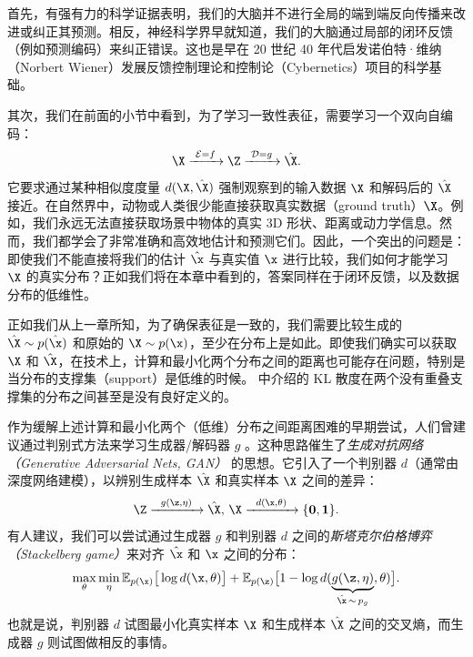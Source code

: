 \documentclass[../../book-main_zh.tex]{subfiles}
\begin{document}
首先，有强有力的科学证据表明，我们的大脑并不进行全局的端到端反向传播来改进或纠正其预测。相反，神经科学界早就知道，我们的大脑通过局部的闭环反馈（例如预测编码）来纠正错误。这也是早在 20 世纪 40 年代启发诺伯特·维纳（Norbert Wiener）发展反馈控制理论和控制论（Cybernetics）项目的科学基础。

其次，我们在前面的小节中看到，为了学习一致性表征，需要学习一个双向自编码：
\begin{equation}
    \X
    \xrightarrow{\hspace{1mm} \mathcal{E} = f \hspace{1mm}} \Z
    \xrightarrow{\hspace{1mm} \mathcal{D} = g \hspace{1mm}} \hat{\X}.
\end{equation}
它要求通过某种相似度度量 $d(\X, \hat \X)$ 强制观察到的输入数据 $\X$ 和解码后的 $\hat \X$ 接近。在自然界中，动物或人类很少能直接获取真实数据（ground truth）$\X$。例如，我们永远无法直接获取场景中物体的真实 3D 形状、距离或动力学信息。然而，我们都学会了非常准确和高效地估计和预测它们。因此，一个突出的问题是：即使我们不能直接将我们的估计 $\hat \x$ 与真实值 $\x$ 进行比较，我们如何才能学习 $\X$ 的真实分布？正如我们将在本章中看到的，答案同样在于闭环反馈，以及数据分布的低维性。

正如我们从上一章所知，为了确保表征是一致的，我们需要比较生成的 $\hat \X \sim p(\hat\x)$ 和原始的 $\X \sim p(\x)$，至少在分布上是如此。即使我们确实可以获取 $\X$ 和 $\hat \X$，在技术上，计算和最小化两个分布之间的距离也可能存在问题，特别是当分布的支撑集（support）是低维的时候。 中介绍的 KL 散度在两个没有重叠支撑集的分布之间甚至是没有良好定义的。

作为缓解上述计算和最小化两个（低维）分布之间距离困难的早期尝试，人们曾建议通过判别式方法来学习生成器/解码器 $g$ \cite{Tu-2007}。这种思路催生了{\em 生成对抗网络（Generative Adversarial Nets, GAN）} \cite{goodfellow2014generative} 的思想。它引入了一个判别器 $d$（通常由深度网络建模），以辨别生成样本 $\hat \X$ 和真实样本 $\X$ 之间的差异：
\begin{equation}
    \Z \xrightarrow{\hspace{2mm} g(\z,\eta) \hspace{2mm}} \hat \X, \,
    \X \xrightarrow{\hspace{2mm} d(\x, \theta)\hspace{2mm}} \{\mathbf
    0, \mathbf 1\}.
    \label{eqn:GAN}
\end{equation}
有人建议，我们可以尝试通过生成器 $g$ 和判别器 $d$ 之间的{\em 斯塔克尔伯格博弈（Stackelberg game）}来对齐 $\hat \x$ 和 $\x$ 之间的分布：
\begin{equation}
    \max_{\theta}\min_{\eta} \mathbb{E}_{p({\x})}\big[\log
    d(\x,\theta)\big] + \mathbb{E}_{p({\z})}\big[1 - \log
    d(\underbrace{g(\z,\eta)}_{\hat \x \,\sim\, p_g},\theta)\big].
\end{equation}
也就是说，判别器 $d$ 试图最小化真实样本 $\X$ 和生成样本 $\hat \X$ 之间的交叉熵，而生成器 $g$ 则试图做相反的事情。
\end{document}
